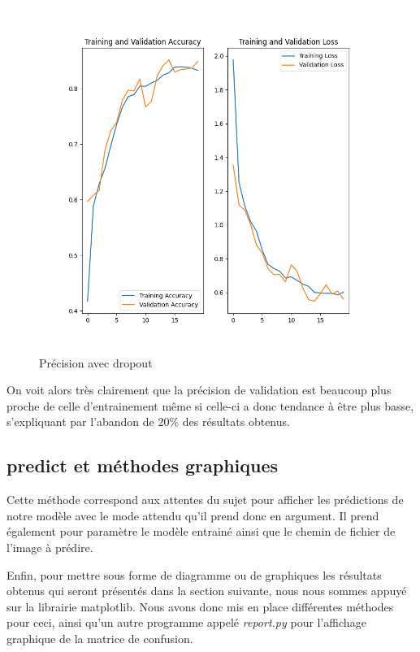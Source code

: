 \documentclass[12pt ,a4paper ]{article}
\begin{document}
\begin{multicols}{2}
\begin{figure}[H]
    \begin{center}
        \includegraphics[scale=0.4]{./img/figure_1.png}
    \end{center}
\caption{\small{Précision avec dropout}}
\end{figure}

On voit alors très clairement que la précision de validation est beaucoup plus proche de celle d'entrainement même si celle-ci a donc tendance à être plus basse, s'expliquant par l'abandon de 20\% des résultats obtenus. 

\subsection{predict et méthodes graphiques}
Cette méthode correspond aux attentes du sujet pour afficher les prédictions de notre modèle avec le mode attendu qu'il prend donc en argument. Il prend également pour paramètre le modèle entrainé ainsi que le chemin de fichier de l'image à prédire. 

Enfin, pour mettre sous forme de diagramme ou de graphiques les résultats obtenus qui seront présentés dans la section suivante, nous nous sommes appuyé sur la librairie matplotlib. Nous avons donc mis en place différentes méthodes pour ceci, ainsi qu'un autre programme appelé \textit{report.py} pour l'affichage graphique de la matrice de confusion. 


\end{multicols}
\end{document}
